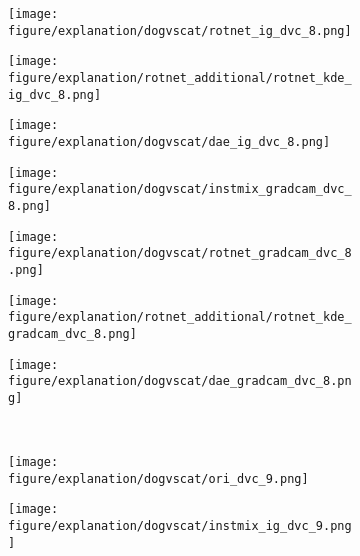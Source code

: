 \documentclass{article} \usepackage{iclr2021_conference,times}
\begin{document}
\begin{figure}[h!]
\hspace{-2mm}
\begin{subfigure}{.11\textwidth}
  \centering
  \texttt{[image: figure/explanation/dogvscat/rotnet\_ig\_dvc\_8.png]}
\end{subfigure}
\hspace{-2mm}
\begin{subfigure}{.11\textwidth}
  \centering
  \texttt{[image: figure/explanation/rotnet\_additional/rotnet\_kde\_ig\_dvc\_8.png]}
\end{subfigure}
\hspace{-2mm}
\begin{subfigure}{.11\textwidth}
  \centering
  \texttt{[image: figure/explanation/dogvscat/dae\_ig\_dvc\_8.png]}
\end{subfigure}
\hspace{-2mm}
\begin{subfigure}{.11\textwidth}
  \centering
  \texttt{[image: figure/explanation/dogvscat/instmix\_gradcam\_dvc\_8.png]}
\end{subfigure}
\hspace{-2mm}
\begin{subfigure}{.11\textwidth}
  \centering
  \texttt{[image: figure/explanation/dogvscat/rotnet\_gradcam\_dvc\_8.png]}
\end{subfigure}
\hspace{-2mm}
\begin{subfigure}{.11\textwidth}
  \centering
  \texttt{[image: figure/explanation/rotnet\_additional/rotnet\_kde\_gradcam\_dvc\_8.png]}
\end{subfigure}
\hspace{-2mm}
\begin{subfigure}{.11\textwidth}
  \centering
  \texttt{[image: figure/explanation/dogvscat/dae\_gradcam\_dvc\_8.png]}
\end{subfigure}\\
\begin{subfigure}{.11\textwidth}
  \centering
  \texttt{[image: figure/explanation/dogvscat/ori\_dvc\_9.png]}
\end{subfigure}
\hspace{-2mm}
\begin{subfigure}{.11\textwidth}
  \centering
  \texttt{[image: figure/explanation/dogvscat/instmix\_ig\_dvc\_9.png]}
\end{subfigure}
\hspace{-2mm}

\end{figure}
\end{document}
